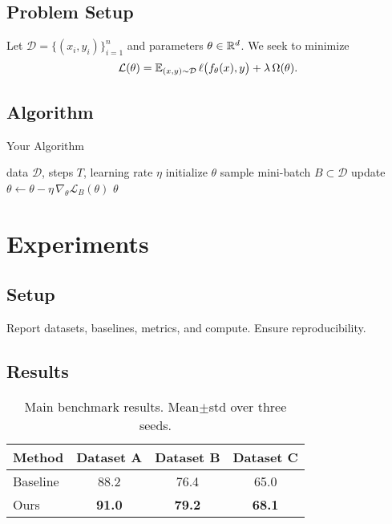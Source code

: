   \subsection{Problem Setup}
  Let $\mathcal{D}=\{(x_i,y_i)\}_{i=1}^n$ and parameters $\theta\in\mathbb{R}^d$. We seek to minimize
  \begin{equation}
    \label{eq:objective}
    \mathcal{L}(\theta)=\mathbb{E}_{(x,y)\sim\mathcal{D}}\, \ell\big(f_\theta(x),y\big)+\lambda\,\Omega(\theta).
  \end{equation}

  \subsection{Algorithm}
  \begin{algorithm}[H]
    \caption{Your Algorithm}
    \label{alg:ours}
    \begin{algorithmic}[1]
      \Require data $\mathcal{D}$, steps $T$, learning rate $\eta$
      \State initialize $\theta$
      \State sample mini-batch $B \subset \mathcal{D}$
      \State update $\theta \leftarrow \theta - \eta\, \nabla_\theta \mathcal{L}_B(\theta)$ 
      \EndFor
      \State \Return $\theta$
    \end{algorithmic}
  \end{algorithm}

  \section{Experiments}
  \subsection{Setup}
  Report datasets, baselines, metrics, and compute. Ensure reproducibility.

  \subsection{Results}
  \begin{table}[H]
    \centering
    \caption{Main benchmark results. Mean$\pm$std over three seeds.}
    \label{tab:main}
    \begin{tabular}{@{}lccc@{}}
      \toprule
      Method & Dataset A & Dataset B & Dataset C \\
      \midrule
      Baseline & 88.2 & 76.4 & 65.0 \\
      Ours & \textbf{91.0} & \textbf{79.2} & \textbf{68.1} \\
      \bottomrule
    \end{tabular}
  \end{table}

